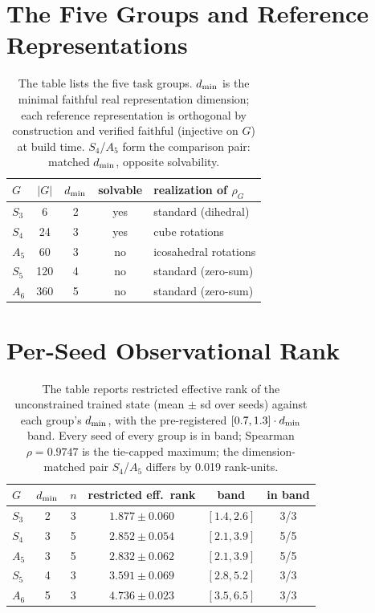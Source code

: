 \appendix

\section{The Five Groups and Reference Representations}
\label{app:groups}

\begin{table}[H]
\centering
\small
\begin{tabular}{lcccl}
\toprule
$G$ & $|G|$ & $d_{\min}$ & solvable & realization of $\rho_G$ \\
\midrule
$S_3$ & 6   & 2 & yes & standard (dihedral) \\
$S_4$ & 24  & 3 & yes & cube rotations \\
$A_5$ & 60  & 3 & no  & icosahedral rotations \\
$S_5$ & 120 & 4 & no  & standard (zero-sum) \\
$A_6$ & 360 & 5 & no  & standard (zero-sum) \\
\bottomrule
\end{tabular}
\caption{The table lists the five task groups. $d_{\min}$ is the minimal faithful real
representation dimension; each reference representation is orthogonal by
construction and verified faithful (injective on $G$) at build time.
$S_4$/$A_5$ form the comparison pair: matched $d_{\min}$, opposite solvability.}
\label{tab:groups}
\end{table}

\section{Per-Seed Observational Rank}
\label{app:m1}

\begin{table}[H]
\centering
\small
\begin{tabular}{lccccc}
\toprule
$G$ & $d_{\min}$ & $n$ & restricted eff.\ rank & band & in band \\
\midrule
$S_3$ & 2 & 3 & $1.877 \pm 0.060$ & $[1.4, 2.6]$ & 3/3 \\
$S_4$ & 3 & 5 & $2.852 \pm 0.054$ & $[2.1, 3.9]$ & 5/5 \\
$A_5$ & 3 & 5 & $2.832 \pm 0.062$ & $[2.1, 3.9]$ & 5/5 \\
$S_5$ & 4 & 3 & $3.591 \pm 0.069$ & $[2.8, 5.2]$ & 3/3 \\
$A_6$ & 5 & 3 & $4.736 \pm 0.023$ & $[3.5, 6.5]$ & 3/3 \\
\bottomrule
\end{tabular}
\caption{The table reports restricted effective rank of the unconstrained
trained state (mean $\pm$ sd over seeds) against each group's $d_{\min}$, with
the pre-registered $[0.7, 1.3] \cdot d_{\min}$ band. Every seed of every group is
in band; Spearman $\rho = 0.9747$ is the tie-capped maximum; the
dimension-matched pair $S_4$/$A_5$ differs by 0.019 rank-units.}
\label{tab:m1}
\end{table}

